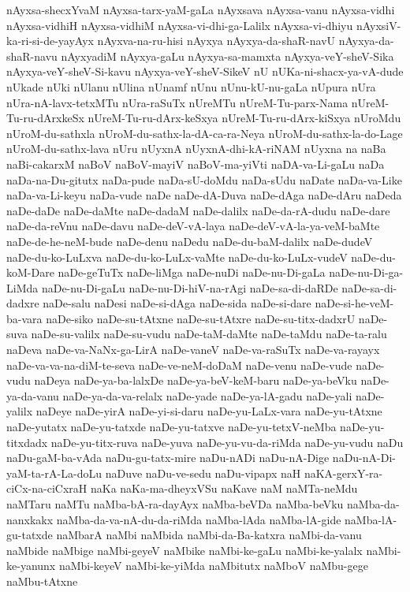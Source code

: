 {nAyxsa-shecxYvaM
nAyxsa-tarx-yaM-gaLa
nAyxsava
nAyxsa-vanu
nAyxsa-vidhi
nAyxsa-vidhiH
nAyxsa-vidhiM
nAyxsa-vi-dhi-ga-Lalilx
nAyxsa-vi-dhiyu
nAyxsiV-ka-ri-si-de-yayAyx
nAyxva-na-ru-hisi
nAyxya
nAyxya-da-shaR-navU
nAyxya-da-shaR-navu
nAyxyadiM
nAyxya-gaLu
nAyxya-sa-mamxta
nAyxya-veY-sheV-Sika
nAyxya-veY-sheV-Si-kavu
nAyxya-veY-sheV-SikeV
nU
nUKa-ni-shacx-ya-vA-dude
nUkade
nUki
nUlanu
nUlina
nUnamf
nUnu
nUnu-kU-nu-gaLa
nUpura
nUra
nUra-nA-lavx-tetxMTu
nUra-raSuTx
nUreMTu
nUreM-Tu-parx-Nama
nUreM-Tu-ru-dArxkeSx
nUreM-Tu-ru-dArx-keSxya
nUreM-Tu-ru-dArx-kiSxya
nUroMdu
nUroM-du-sathxla
nUroM-du-sathx-la-dA-ca-ra-Neya
nUroM-du-sathx-la-do-Lage
nUroM-du-sathx-lava
nUru
nUyxnA
nUyxnA-dhi-kA-riNAM
nUyxna
na
naBa
naBi-cakarxM
naBoV
naBoV-mayiV
naBoV-ma-yiVti
naDA-va-Li-gaLu
naDa
naDa-na-Du-gitutx
naDa-pude
naDa-sU-doMdu
naDa-sUdu
naDate
naDa-va-Like
naDa-va-Li-keyu
naDa-vude
naDe
naDe-dA-Duva
naDe-dAga
naDe-dAru
naDeda
naDe-daDe
naDe-daMte
naDe-dadaM
naDe-dalilx
naDe-da-rA-dudu
naDe-dare
naDe-da-reVnu
naDe-davu
naDe-deV-vA-laya
naDe-deV-vA-la-ya-veM-baMte
naDe-de-he-neM-bude
naDe-denu
naDedu
naDe-du-baM-dalilx
naDe-dudeV
naDe-du-ko-LuLxva
naDe-du-ko-LuLx-vaMte
naDe-du-ko-LuLx-vudeV
naDe-du-koM-Dare
naDe-geTuTx
naDe-liMga
naDe-nuDi
naDe-nu-Di-gaLa
naDe-nu-Di-ga-LiMda
naDe-nu-Di-gaLu
naDe-nu-Di-hiV-na-rAgi
naDe-sa-di-daRDe
naDe-sa-di-dadxre
naDe-salu
naDesi
naDe-si-dAga
naDe-sida
naDe-si-dare
naDe-si-he-veM-ba-vara
naDe-siko
naDe-su-tAtxne
naDe-su-tAtxre
naDe-su-titx-dadxrU
naDe-suva
naDe-su-valilx
naDe-su-vudu
naDe-taM-daMte
naDe-taMdu
naDe-ta-ralu
naDeva
naDe-va-NaNx-ga-LirA
naDe-vaneV
naDe-va-raSuTx
naDe-va-rayayx
naDe-va-va-na-diM-te-seva
naDe-ve-neM-doDaM
naDe-venu
naDe-vude
naDe-vudu
naDeya
naDe-ya-ba-lalxDe
naDe-ya-beV-keM-baru
naDe-ya-beVku
naDe-ya-da-vanu
naDe-ya-da-va-relalx
naDe-yade
naDe-ya-lA-gadu
naDe-yali
naDe-yalilx
naDeye
naDe-yirA
naDe-yi-si-daru
naDe-yu-LaLx-vara
naDe-yu-tAtxne
naDe-yutatx
naDe-yu-tatxde
naDe-yu-tatxve
naDe-yu-tetxV-neMba
naDe-yu-titxdadx
naDe-yu-titx-ruva
naDe-yuva
naDe-yu-vu-da-riMda
naDe-yu-vudu
naDu
naDu-gaM-ba-vAda
naDu-gu-tatx-mire
naDu-nADi
naDu-nA-Dige
naDu-nA-Di-yaM-ta-rA-La-doLu
naDuve
naDu-ve-sedu
naDu-vipapx
naH
naKA-gerxY-ra-ciCx-na-ciCxraH
naKa
naKa-ma-dheyxVSu
naKave
naM
naMTa-neMdu
naMTaru
naMTu
naMba-bA-ra-dayAyx
naMba-beVDa
naMba-beVku
naMba-da-nanxkakx
naMba-da-va-nA-du-da-riMda
naMba-lAda
naMba-lA-gide
naMba-lA-gu-tatxde
naMbarA
naMbi
naMbida
naMbi-da-Ba-katxra
naMbi-da-vanu
naMbide
naMbige
naMbi-geyeV
naMbike
naMbi-ke-gaLu
naMbi-ke-yalalx
naMbi-ke-yanunx
naMbi-keyeV
naMbi-ke-yiMda
naMbitutx
naMboV
naMbu-gege
naMbu-tAtxne
}
